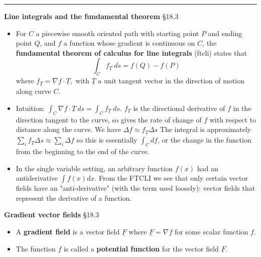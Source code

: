 \documentclass[12pt,letterpaper,noanswers]{exam}
\newcommand{\mb}[1]{\underline{#1}}
\begin{document}
\vspace{0.2cm}
\hrule
\vspace{0.2cm}
\noindent\textbf{Line integrals and the fundamental theorem} \S 18.3
\begin{tcolorbox}
\begin{itemize}
\itemsep0em
    \item For $C$ a piecewise smooth oriented path with starting point $P$ and ending point $Q$, and $f$ a function whose gradient is continuous on $C$, the \textbf{fundamental theorem of calculus for line integrals} (ftcli) states that \[\int_C f_{\mb T}\ ds =f(Q)-f(P)\] where  $f_{\mb T} = \nabla f \cdot \mb{T},$ with $\mb T$ a unit tangent vector in the direction of motion along curve $C$.
    \item Intuition: $\displaystyle\int_C \nabla f \cdot \mb T\ ds = \int_C f_{\mb T}\ ds$.  $f_{\mb T}$ is the directional derivative of $f$ in the direction tangent to the curve, so gives the rate of change of $f$ with respect to distance along the curve.  We have $\Delta f\approx f_{\mb T}\Delta s$  The integral is approximately $\displaystyle\sum_i f_{\mb T}\Delta s \approx \sum_i \Delta f$ so this is essentially $\int_C df$, or the change in the function from the beginning to the end of the curve.
    \item In the single variable setting, an arbitrary function $f(x)$ had an antiderivative $\int f(x) dx$.  From the FTCLI we see that only certain vector fields have an "anti-derivative" (with the term used loosely): vector fields that represent the derivative of a function.
\end{itemize}

\end{tcolorbox}


 \noindent\textbf{Gradient vector fields} \S 18.3
\begin{tcolorbox}
\begin{itemize}
\itemsep0em
    \item A \textbf{gradient field} is a vector field $\mb F$ where $\mb F = \nabla f$ for some scalar function $f$. 
    \item The function $f$ is called a \textbf{potential function} for the vector field $\mb F$.
\end{itemize}
\end{tcolorbox}


\end{document}
